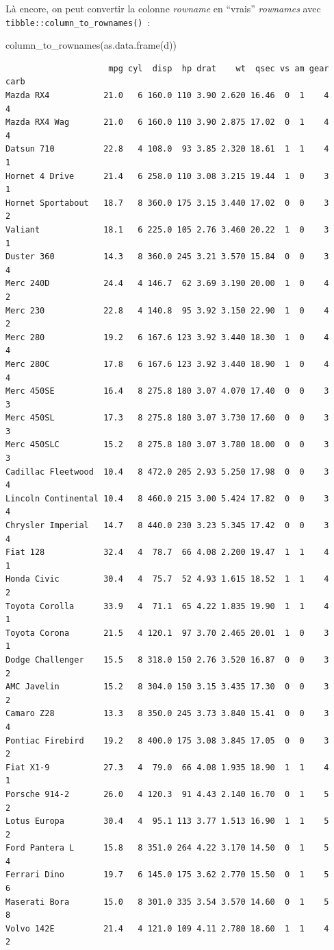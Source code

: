\documentclass[
  letterpaper,
  DIV=11,
  numbers=noendperiod,
  oneside]{scrreprt}
\newenvironment{Shaded}{\begin{snugshade}}{\end{snugshade}}
\newcommand{\FunctionTok}[1]{\textcolor[rgb]{0.28,0.35,0.67}{#1}}
\newcommand{\NormalTok}[1]{\textcolor[rgb]{0.00,0.23,0.31}{#1}}
\begin{document}
Là encore, on peut convertir la colonne \emph{rowname} en ``vrais''
\emph{rownames} avec \texttt{tibble::column\_to\_rownames()}~:

\begin{Shaded}
\begin{Highlighting}[]
\FunctionTok{column\_to\_rownames}\NormalTok{(}\FunctionTok{as.data.frame}\NormalTok{(d))}
\end{Highlighting}
\end{Shaded}

\begin{verbatim}
                     mpg cyl  disp  hp drat    wt  qsec vs am gear carb
Mazda RX4           21.0   6 160.0 110 3.90 2.620 16.46  0  1    4    4
Mazda RX4 Wag       21.0   6 160.0 110 3.90 2.875 17.02  0  1    4    4
Datsun 710          22.8   4 108.0  93 3.85 2.320 18.61  1  1    4    1
Hornet 4 Drive      21.4   6 258.0 110 3.08 3.215 19.44  1  0    3    1
Hornet Sportabout   18.7   8 360.0 175 3.15 3.440 17.02  0  0    3    2
Valiant             18.1   6 225.0 105 2.76 3.460 20.22  1  0    3    1
Duster 360          14.3   8 360.0 245 3.21 3.570 15.84  0  0    3    4
Merc 240D           24.4   4 146.7  62 3.69 3.190 20.00  1  0    4    2
Merc 230            22.8   4 140.8  95 3.92 3.150 22.90  1  0    4    2
Merc 280            19.2   6 167.6 123 3.92 3.440 18.30  1  0    4    4
Merc 280C           17.8   6 167.6 123 3.92 3.440 18.90  1  0    4    4
Merc 450SE          16.4   8 275.8 180 3.07 4.070 17.40  0  0    3    3
Merc 450SL          17.3   8 275.8 180 3.07 3.730 17.60  0  0    3    3
Merc 450SLC         15.2   8 275.8 180 3.07 3.780 18.00  0  0    3    3
Cadillac Fleetwood  10.4   8 472.0 205 2.93 5.250 17.98  0  0    3    4
Lincoln Continental 10.4   8 460.0 215 3.00 5.424 17.82  0  0    3    4
Chrysler Imperial   14.7   8 440.0 230 3.23 5.345 17.42  0  0    3    4
Fiat 128            32.4   4  78.7  66 4.08 2.200 19.47  1  1    4    1
Honda Civic         30.4   4  75.7  52 4.93 1.615 18.52  1  1    4    2
Toyota Corolla      33.9   4  71.1  65 4.22 1.835 19.90  1  1    4    1
Toyota Corona       21.5   4 120.1  97 3.70 2.465 20.01  1  0    3    1
Dodge Challenger    15.5   8 318.0 150 2.76 3.520 16.87  0  0    3    2
AMC Javelin         15.2   8 304.0 150 3.15 3.435 17.30  0  0    3    2
Camaro Z28          13.3   8 350.0 245 3.73 3.840 15.41  0  0    3    4
Pontiac Firebird    19.2   8 400.0 175 3.08 3.845 17.05  0  0    3    2
Fiat X1-9           27.3   4  79.0  66 4.08 1.935 18.90  1  1    4    1
Porsche 914-2       26.0   4 120.3  91 4.43 2.140 16.70  0  1    5    2
Lotus Europa        30.4   4  95.1 113 3.77 1.513 16.90  1  1    5    2
Ford Pantera L      15.8   8 351.0 264 4.22 3.170 14.50  0  1    5    4
Ferrari Dino        19.7   6 145.0 175 3.62 2.770 15.50  0  1    5    6
Maserati Bora       15.0   8 301.0 335 3.54 3.570 14.60  0  1    5    8
Volvo 142E          21.4   4 121.0 109 4.11 2.780 18.60  1  1    4    2
\end{verbatim}
\end{document}
